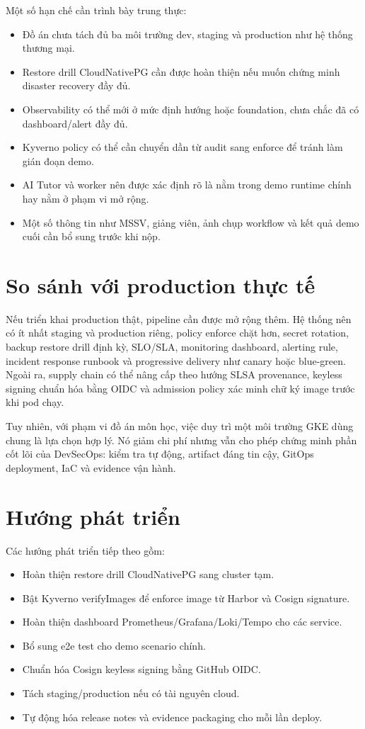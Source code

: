Một số hạn chế cần trình bày trung thực:

\begin{itemize}
  \item Đồ án chưa tách đủ ba môi trường dev, staging và production như hệ thống thương mại.
  \item Restore drill CloudNativePG cần được hoàn thiện nếu muốn chứng minh disaster recovery đầy đủ.
  \item Observability có thể mới ở mức định hướng hoặc foundation, chưa chắc đã có dashboard/alert đầy đủ.
  \item Kyverno policy có thể cần chuyển dần từ audit sang enforce để tránh làm gián đoạn demo.
  \item AI Tutor và worker nên được xác định rõ là nằm trong demo runtime chính hay nằm ở phạm vi mở rộng.
  \item Một số thông tin như MSSV, giảng viên, ảnh chụp workflow và kết quả demo cuối cần bổ sung trước khi nộp.
\end{itemize}

\section{So sánh với production thực tế}

Nếu triển khai production thật, pipeline cần được mở rộng thêm. Hệ thống nên có ít nhất staging và production riêng, policy enforce chặt hơn, secret rotation, backup restore drill định kỳ, SLO/SLA, monitoring dashboard, alerting rule, incident response runbook và progressive delivery như canary hoặc blue-green. Ngoài ra, supply chain có thể nâng cấp theo hướng SLSA provenance, keyless signing chuẩn hóa bằng OIDC và admission policy xác minh chữ ký image trước khi pod chạy.

Tuy nhiên, với phạm vi đồ án môn học, việc duy trì một môi trường GKE dùng chung là lựa chọn hợp lý. Nó giảm chi phí nhưng vẫn cho phép chứng minh phần cốt lõi của DevSecOps: kiểm tra tự động, artifact đáng tin cậy, GitOps deployment, IaC và evidence vận hành.

\section{Hướng phát triển}

Các hướng phát triển tiếp theo gồm:

\begin{itemize}
  \item Hoàn thiện restore drill CloudNativePG sang cluster tạm.
  \item Bật Kyverno verifyImages để enforce image từ Harbor và Cosign signature.
  \item Hoàn thiện dashboard Prometheus/Grafana/Loki/Tempo cho các service.
  \item Bổ sung e2e test cho demo scenario chính.
  \item Chuẩn hóa Cosign keyless signing bằng GitHub OIDC.
  \item Tách staging/production nếu có tài nguyên cloud.
  \item Tự động hóa release notes và evidence packaging cho mỗi lần deploy.
\end{itemize}
